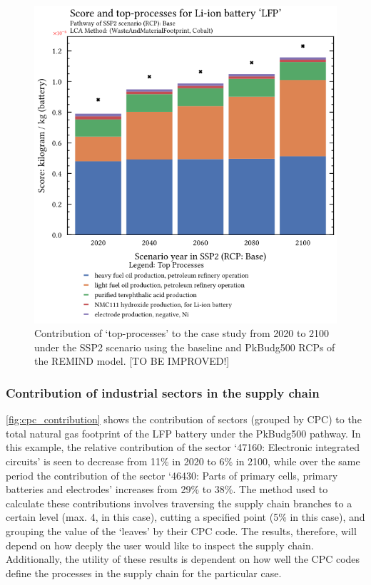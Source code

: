\begin{figure}[H]
    \centering
    \includegraphics[width=0.6\linewidth]{figures/top-processes.png}
    \caption{Contribution of `top-processes' to the case study from 2020 to 2100 under the SSP2 scenario using the baseline and PkBudg500 RCPs of the REMIND model. [TO BE IMPROVED!]}\label{fig:top_contribution}
\end{figure}


\subsubsection{Contribution of industrial sectors in the supply chain}\label{sec:results-case_study-topsectors}

\autoref{fig:cpc_contribution} shows the contribution of sectors (grouped by CPC) to the total natural gas footprint of the LFP battery under the PkBudg500 pathway. In this example, the relative contribution of the sector `47160: Electronic integrated circuits' is seen to decrease from 11\% in 2020 to 6\% in 2100, while over the same period the contribution of the sector `46430: Parts of primary cells, primary batteries and electrodes' increases from 29\% to 38\%. The method used to calculate these contributions involves traversing the supply chain branches to a certain level (max. 4, in this case), cutting a specified point (5\% in this case), and grouping the value of the `leaves' by their CPC code. The results, therefore, will depend on how deeply the user would like to inspect the supply chain. Additionally, the utility of these results is dependent on how well the CPC codes define the processes in the supply chain for the particular case.


